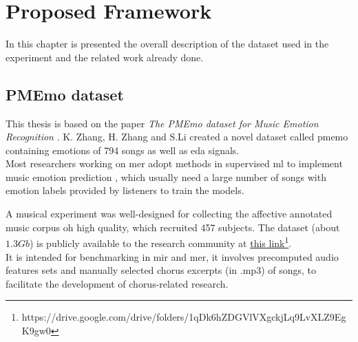 \chapter{Proposed Framework}
\label{chap:proposed_framework}
\pagestyle{plain}
\vspace{0.5cm}

\noindent In this chapter is presented the overall description of the dataset used in the experiment and the related work already done.

\section{PMEmo dataset}
This thesis is based on the paper \textit{The PMEmo dataset for Music Emotion Recognition} \cite{zhang2018pmemo}. K. Zhang, H. Zhang and S.Li created a novel dataset called \gls{pmemo} containing emotions of 794 songs as well as \gls{eda} signals.
\\

Most researchers working on \gls{mer} adopt methods in supervised \gls{ml} to implement music emotion prediction \cite{yang2012machine}, which usually need a large number of songs with emotion labels provided by listeners to train the models.

A musical experiment was well-designed for collecting the affective annotated music corpus oh high quality, which recruited 457 subjects.
The dataset (about $1.3Gb$) is publicly available to the research community at \href{https://drive.google.com/drive/folders/1qDk6hZDGVlVXgckjLq9LvXLZ9EgK9gw0}{this link}\footnote{https://drive.google.com/drive/folders/1qDk6hZDGVlVXgckjLq9LvXLZ9EgK9gw0}.
\\
It is intended for benchmarking in \gls{mir} and \gls{mer}, it involves precomputed audio features sets and manually selected chorus excerpts (in .mp3) of songs, to facilitate the development of chorus-related research.

